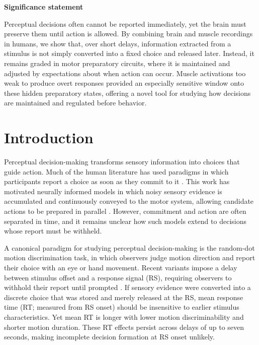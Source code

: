 \textbf{Significance statement}

Perceptual decisions often cannot be reported immediately, yet the brain must preserve them until action is allowed. By combining brain and muscle recordings in humans, we show that, over short delays, information extracted from a stimulus is not simply converted into a fixed choice and released later. Instead, it remains graded in motor preparatory circuits, where it is maintained and adjusted by expectations about when action can occur. Muscle activations too weak to produce overt responses provided an especially sensitive window onto these hidden preparatory states, offering a novel tool for studying how decisions are maintained and regulated before behavior.


\section{Introduction}

Perceptual decision-making transforms sensory information into choices that guide action. Much of the human literature has used paradigms in which participants report a choice as soon as they commit to it  \parencites{forstmannSequentialSamplingModels2016}{oconnellNeurophysiologyHumanPerceptual2021}. This work has motivated neurally informed models in which noisy sensory evidence is accumulated and continuously conveyed to the motor system, allowing candidate actions to be prepared in parallel  \parencites{balsdonSecondaryMotorIntegration2023}{dendauwGatedCascadeDiffusion2024}{kellyNeurocomputationalMechanismsPriorinformed2021}.  However, commitment and action are often separated in time, and it remains unclear how such models extend to decisions whose report must be withheld.

A canonical paradigm for studying perceptual decision-making is the random-dot motion discrimination task, in which observers judge motion direction and report their choice with an eye or hand movement. Recent variants impose a delay between stimulus offset and a response signal (RS), requiring observers to withhold their report until prompted  \parencites{achardExtendingContinuousFlow2025}{MotorCorticalSignals}.  If sensory evidence were converted into a discrete choice that was stored and merely released at the RS, mean response time (RT; measured from RS onset) should be insensitive to earlier stimulus characteristics. Yet mean RT is longer with lower motion discriminability and shorter motion duration. These RT effects persist across delays of up to seven seconds, making incomplete decision formation at RS onset unlikely.


